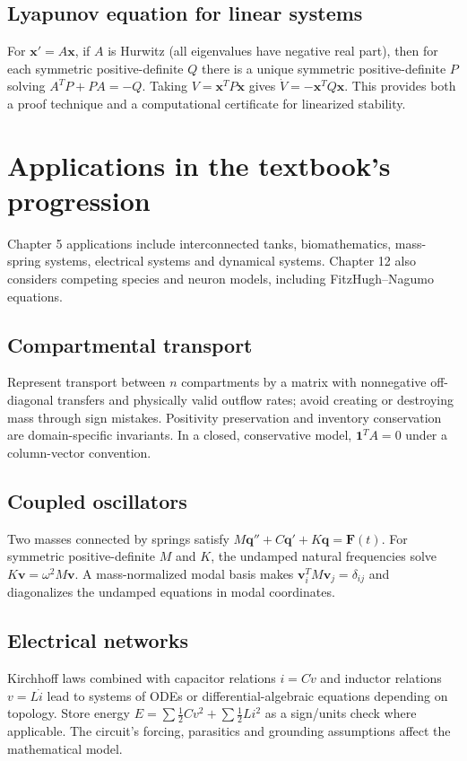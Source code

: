 \documentclass[11pt,letterpaper,oneside]{report}
\theoremstyle{definition}\newtheorem{definition}[theorem]{Definition}
\theoremstyle{remark}\newtheorem{remark}[theorem]{Remark}
\begin{document}
\section{Lyapunov equation for linear systems}
For $\mathbf x'=A\mathbf x$, if $A$ is Hurwitz (all eigenvalues have negative real part), then for each symmetric positive-definite $Q$ there is a unique symmetric positive-definite $P$ solving $A^TP+PA=-Q$. Taking $V=\mathbf x^TP\mathbf x$ gives $\dot V=-\mathbf x^TQ\mathbf x$. This provides both a proof technique and a computational certificate for linearized stability.
\chapter{Applications in the textbook's progression}
\begin{bookground}Chapter 5 applications include interconnected tanks, biomathematics, mass-spring systems, electrical systems and dynamical systems. Chapter 12 also considers competing species and neuron models, including FitzHugh--Nagumo equations.\end{bookground}
\section{Compartmental transport}
Represent transport between $n$ compartments by a matrix with nonnegative off-diagonal transfers and physically valid outflow rates; avoid creating or destroying mass through sign mistakes. Positivity preservation and inventory conservation are domain-specific invariants. In a closed, conservative model, $\mathbf 1^T A=0$ under a column-vector convention.
\section{Coupled oscillators}
Two masses connected by springs satisfy $M\mathbf q''+C\mathbf q'+K\mathbf q=\mathbf F(t)$. For symmetric positive-definite $M$ and $K$, the undamped natural frequencies solve $K\mathbf v=\omega^2 M\mathbf v$. A mass-normalized modal basis makes $\mathbf v_i^TM\mathbf v_j=\delta_{ij}$ and diagonalizes the undamped equations in modal coordinates.
\section{Electrical networks}
Kirchhoff laws combined with capacitor relations $i=C\dot v$ and inductor relations $v=L\dot i$ lead to systems of ODEs or differential-algebraic equations depending on topology. Store energy $E=\sum\frac12 C v^2+\sum\frac12 L i^2$ as a sign/units check where applicable. The circuit's forcing, parasitics and grounding assumptions affect the mathematical model.
\end{document}
